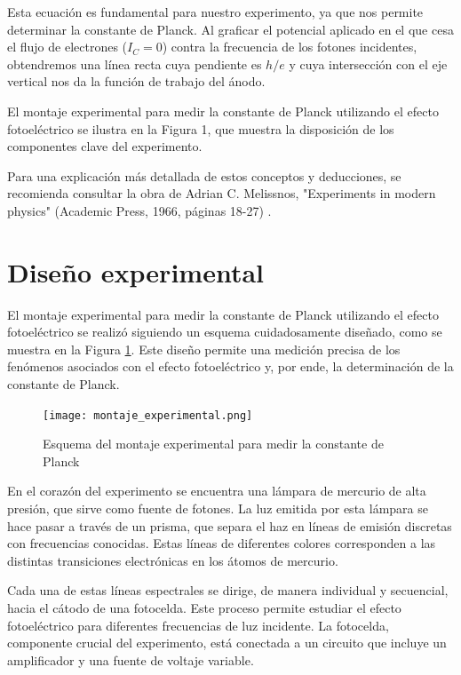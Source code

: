 \documentclass[twocolumn,a4paper,11pt]{scrartcl}
\begin{document}
Esta ecuación es fundamental para nuestro experimento, ya que nos permite determinar la constante de Planck. Al graficar el potencial aplicado en el que cesa el flujo de electrones ($I_C = 0$) contra la frecuencia de los fotones incidentes, obtendremos una línea recta cuya pendiente es $h/e$ y cuya intersección con el eje vertical nos da la función de trabajo del ánodo.

El montaje experimental para medir la constante de Planck utilizando el efecto fotoeléctrico se ilustra en la Figura 1, que muestra la disposición de los componentes clave del experimento.

Para una explicación más detallada de estos conceptos y deducciones, se recomienda consultar la obra de Adrian C. Melissnos, "Experiments in modern physics" (Academic Press, 1966, páginas 18-27) \cite{melissnos1966}.

\section{Diseño experimental}

El montaje experimental para medir la constante de Planck utilizando el efecto fotoeléctrico se realizó siguiendo un esquema cuidadosamente diseñado, como se muestra en la Figura \ref{fig:montaje}. Este diseño permite una medición precisa de los fenómenos asociados con el efecto fotoeléctrico y, por ende, la determinación de la constante de Planck.

\begin{figure}[h]
    \centering
    \texttt{[image: montaje\_experimental.png]}
    \caption{Esquema del montaje experimental para medir la constante de Planck}
    \label{fig:montaje}
\end{figure}

En el corazón del experimento se encuentra una lámpara de mercurio de alta presión, que sirve como fuente de fotones. La luz emitida por esta lámpara se hace pasar a través de un prisma, que separa el haz en líneas de emisión discretas con frecuencias conocidas. Estas líneas de diferentes colores corresponden a las distintas transiciones electrónicas en los átomos de mercurio.

Cada una de estas líneas espectrales se dirige, de manera individual y secuencial, hacia el cátodo de una fotocelda. Este proceso permite estudiar el efecto fotoeléctrico para diferentes frecuencias de luz incidente. La fotocelda, componente crucial del experimento, está conectada a un circuito que incluye un amplificador y una fuente de voltaje variable.
\end{document}
